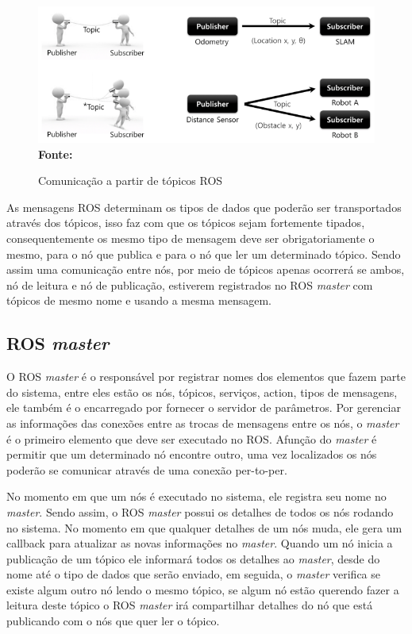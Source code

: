 \begin{figure}[ht]
	\caption{Comunicação a partir de tópicos ROS}
	\begin{center}
		\includegraphics[scale=0.51]{imagens/rostopic.png}\\
		{\small \textbf{Fonte:} }
    \end{center}\label{fig:rostopic}
\end{figure}

As mensagens ROS determinam os tipos de dados que poderão ser transportados através dos tópicos, isso faz com que os tópicos sejam fortemente tipados, consequentemente os mesmo tipo de mensagem deve ser obrigatoriamente o mesmo, para o nó que publica e para o nó que ler um determinado tópico. Sendo assim uma comunicação entre nós, por meio de tópicos apenas ocorrerá se ambos, nó de leitura e nó de publicação, estiverem registrados no ROS \textit{master} com tópicos de mesmo nome e usando a mesma mensagem.


\subsection{ROS \textit{master}}

O ROS \textit{master} é o responsável por registrar nomes dos elementos que fazem parte do sistema, entre eles estão os nós, tópicos, serviços, action, tipos de mensagens, ele também é o encarregado por fornecer o servidor de parâmetros. Por gerenciar as informações das conexões entre as trocas de mensagens entre os nós, o \textit{master} é o primeiro elemento que deve ser executado no ROS. Afunção do \textit{master} é permitir que um determinado nó encontre outro, uma vez localizados os nós poderão se comunicar através de uma conexão per-to-per.

No momento em que um nós é executado no sistema, ele registra seu nome no \textit{master}. Sendo assim, o ROS \textit{master} possui os detalhes de todos os nós rodando no sistema. No momento em que qualquer detalhes de um nós muda, ele gera um callback para atualizar as novas informações no \textit{master}. Quando um nó inicia a publicação de um tópico ele informará todos os detalhes ao \textit{master}, desde do nome até o tipo de dados que serão enviado, em seguida, o \textit{master} verifica se existe algum outro nó lendo o mesmo tópico, se algum nó estão querendo fazer a leitura deste tópico o ROS \textit{master} irá compartilhar detalhes do nó que está publicando com o nós que quer ler o tópico.

